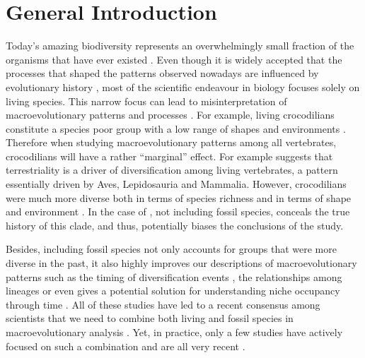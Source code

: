\chapter{General Introduction}
\label{chap:introduction}



%
% 

Today's amazing biodiversity represents an overwhelmingly small fraction of the organisms that have ever existed \citep{novacek1992ext,raup1993extinction}.
Even though it is widely accepted that the processes that shaped the patterns observed nowadays are influenced by evolutionary history \citep{fritzdiversity2013}, most of the scientific endeavour in biology focuses solely on living species.
This narrow focus can lead to misinterpretation of macroevolutionary patterns and processes \citep{benton2015}.
For example, living crocodilians constitute a species poor group \citep[25 species;][]{uetz2010original} with a low range of shapes and environments \citep[marine or freshwater;][]{Martin2008}.
Therefore when studying macroevolutionary patterns among all vertebrates, crocodilians will have a rather ``marginal'' effect.
For example \cite{Wiens2015} suggests that terrestriality is a driver of diversification among living vertebrates, a pattern essentially driven by Aves, Lepidosauria and Mammalia.
However, crocodilians were much more diverse both in terms of species richness \citep[244 species reported in][]{Bronzati2015} and in terms of shape and environment \citep{stubbs2013}.
In the case of \cite{Wiens2015}, not including fossil species, conceals the true history of this clade, and thus, potentially biases the conclusions of the study.

Besides, including fossil species not only accounts for groups that were more diverse in the past, it also highly improves our descriptions of macroevolutionary patterns such as the timing of diversification events \citep[e.g. significantly reducing node age confidence intervals;][]{ronquista2012}, the relationships among lineages \citep[e.g. solving some controversial fossil placement;][]{Dembo2015} or even gives a potential solution for understanding niche occupancy through time \citep[e.g.][]{pearmanniche2008}.
All of these studies have led to a recent consensus among scientists that we need to combine both living and fossil species in macroevolutionary analysis \citep{jacksonwhat2006,quentaldiversity2010,dietlconservation2011,slaterunifying2013,fritzdiversity2013,benton2015}.
Yet, in practice, only a few studies have actively focused on such a combination and are all very recent \citep[e.g.][]{ronquista2012,slaterphylogenetic2013,Wood01032013,beckancient2014,Arcila2015131,Dembo2015}. %

